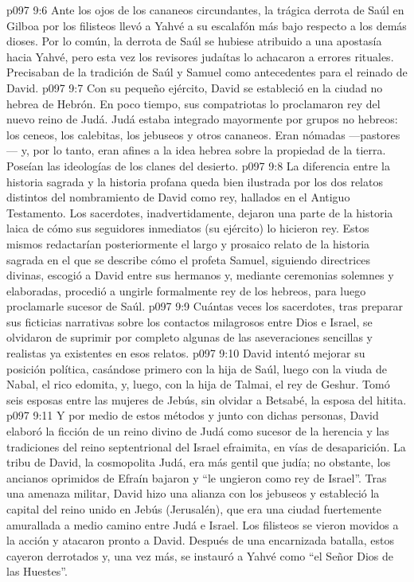 \vs p097 9:6 Ante los ojos de los cananeos circundantes, la trágica derrota de Saúl en Gilboa por los filisteos llevó a Yahvé a su escalafón más bajo respecto a los demás dioses. Por lo común, la derrota de Saúl se hubiese atribuido a una apostasía hacia Yahvé, pero esta vez los revisores judaítas lo achacaron a errores rituales. Precisaban de la tradición de Saúl y Samuel como antecedentes para el reinado de David.
\vs p097 9:7 Con su pequeño ejército, David se estableció en la ciudad no hebrea de Hebrón. En poco tiempo, sus compatriotas lo proclamaron rey del nuevo reino de Judá. Judá estaba integrado mayormente por grupos no hebreos: los ceneos, los calebitas, los jebuseos y otros cananeos. Eran nómadas ---pastores--- y, por lo tanto, eran afines a la idea hebrea sobre la propiedad de la tierra. Poseían las ideologías de los clanes del desierto.
\vs p097 9:8 \pc La diferencia entre la historia sagrada y la historia profana queda bien ilustrada por los dos relatos distintos del nombramiento de David como rey, hallados en el Antiguo Testamento. Los sacerdotes, inadvertidamente, dejaron una parte de la historia laica de cómo sus seguidores inmediatos (su ejército) lo hicieron rey. Estos mismos redactarían posteriormente el largo y prosaico relato de la historia sagrada en el que se describe cómo el profeta Samuel, siguiendo directrices divinas, escogió a David entre sus hermanos y, mediante ceremonias solemnes y elaboradas, procedió a ungirle formalmente rey de los hebreos, para luego proclamarle sucesor de Saúl.
\vs p097 9:9 Cuántas veces los sacerdotes, tras preparar sus ficticias narrativas sobre los contactos milagrosos entre Dios e Israel, se olvidaron de suprimir por completo algunas de las aseveraciones sencillas y realistas ya existentes en esos relatos.
\vs p097 9:10 \pc David intentó mejorar su posición política, casándose primero con la hija de Saúl, luego con la viuda de Nabal, el rico edomita, y, luego, con la hija de Talmai, el rey de Geshur. Tomó seis esposas entre las mujeres de Jebús, sin olvidar a Betsabé, la esposa del hitita.
\vs p097 9:11 Y por medio de estos métodos y junto con dichas personas, David elaboró la ficción de un reino divino de Judá como sucesor de la herencia y las tradiciones del reino septentrional del Israel efraimita, en vías de desaparición. La tribu de David, la cosmopolita Judá, era más gentil que judía; no obstante, los ancianos oprimidos de Efraín bajaron y “le ungieron como rey de Israel”. Tras una amenaza militar, David hizo una alianza con los jebuseos y estableció la capital del reino unido en Jebús (Jerusalén), que era una ciudad fuertemente amurallada a medio camino entre Judá e Israel. Los filisteos se vieron movidos a la acción y atacaron pronto a David. Después de una encarnizada batalla, estos cayeron derrotados y, una vez más, se instauró a Yahvé como “el Señor Dios de las Huestes”.
